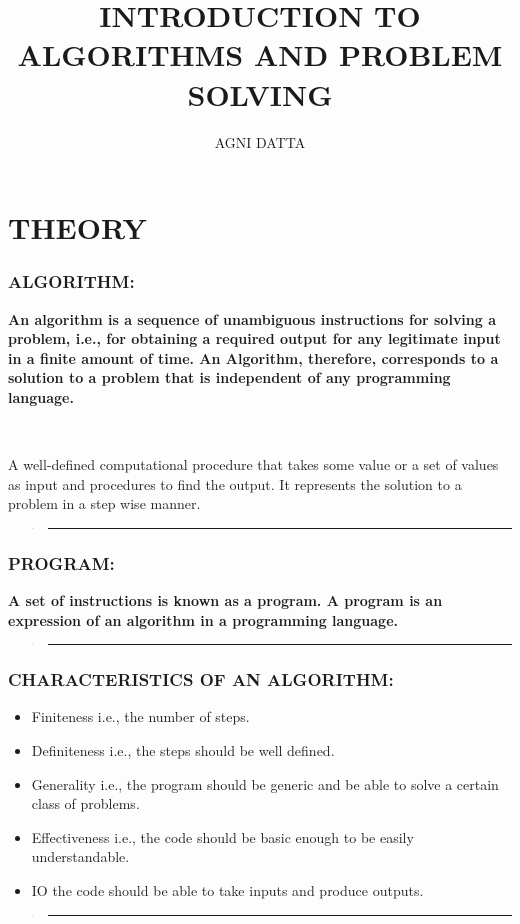 \documentclass[10pt,english]{article}
\begin{document}
\title{\textbf{\huge{}INTRODUCTION TO ALGORITHMS AND PROBLEM SOLVING}}
\author{AGNI DATTA}

\maketitle
{\footnotesize{}\tableofcontents{}}{\footnotesize\par}

\pagebreak{}

\part{THEORY}

\section{ALGORITHM:}

\textbf{An algorithm is a sequence of unambiguous instructions for
solving a problem, i.e., for obtaining a required output for any legitimate
input in a finite amount of time. An Algorithm, therefore, corresponds
to a solution to a problem that is independent of any programming
language. }

\ 

A well-defined computational procedure that takes some value or a
set of values as input and procedures to find the output. It represents
the solution to a problem in a step wise manner. 
\begin{verse}
\rule[0.5ex]{1\columnwidth}{1pt}
\end{verse}

\section{PROGRAM:}

\textbf{A set of instructions is known as a program. A program is
an expression of an algorithm in a programming language.}
\begin{verse}
\rule[0.5ex]{1\columnwidth}{1pt}
\end{verse}

\section{CHARACTERISTICS OF AN ALGORITHM:}
\begin{itemize}
\item Finiteness i.e., the number of steps. 
\item Definiteness i.e., the steps should be well defined.
\item Generality i.e., the program should be generic and be able to solve
a certain class of problems. 
\item Effectiveness i.e., the code should be basic enough to be easily understandable. 
\item IO the code should be able to take inputs and produce outputs.
\end{itemize}
\begin{verse}
\rule[0.5ex]{1\columnwidth}{1pt}
\end{verse}
\end{document}
